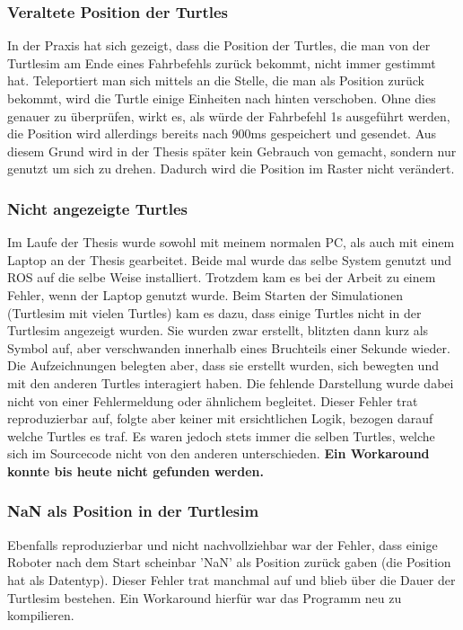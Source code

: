 \subsubsection*{Veraltete Position der Turtles}
In der Praxis hat sich gezeigt, dass die Position der Turtles, die man von der Turtlesim am Ende eines Fahrbefehls zurück bekommt, nicht immer gestimmt hat. Teleportiert man sich mittels  an die Stelle, die man als Position zurück bekommt, wird die Turtle einige Einheiten nach hinten verschoben. Ohne dies genauer zu überprüfen, wirkt es, als würde der Fahrbefehl 1s ausgeführt werden, die Position wird allerdings bereits nach 900ms gespeichert und gesendet.
Aus diesem Grund wird in der Thesis später kein Gebrauch von  gemacht, sondern nur  genutzt um sich zu drehen. Dadurch wird die Position im Raster nicht verändert.

\subsubsection*{Nicht angezeigte Turtles}
Im Laufe der Thesis wurde sowohl mit meinem normalen PC, als auch mit einem Laptop an der Thesis gearbeitet. Beide mal wurde das selbe System genutzt und \ac{ROS} auf die selbe Weise installiert. Trotzdem kam es bei der Arbeit zu einem Fehler, wenn der Laptop genutzt wurde. Beim Starten der Simulationen (Turtlesim mit vielen Turtles) kam es dazu, dass einige Turtles nicht in der Turtlesim angezeigt wurden. Sie wurden zwar erstellt, blitzten dann kurz als Symbol auf, aber verschwanden innerhalb eines Bruchteils einer Sekunde wieder. Die Aufzeichnungen belegten aber, dass sie erstellt wurden, sich bewegten und mit den anderen Turtles interagiert haben. Die fehlende Darstellung wurde dabei nicht von einer Fehlermeldung oder ähnlichem begleitet. Dieser Fehler trat reproduzierbar auf, folgte aber keiner mit ersichtlichen Logik, bezogen darauf welche Turtles es traf. Es waren jedoch stets immer die selben Turtles, welche sich im Sourcecode nicht von den anderen unterschieden. \textbf{Ein Workaround konnte bis heute nicht gefunden werden.}

\subsubsection*{NaN als Position in der Turtlesim}
Ebenfalls reproduzierbar und nicht nachvollziehbar war der Fehler, dass einige Roboter nach dem Start scheinbar 'NaN' als Position zurück gaben (die Position hat  als Datentyp). Dieser Fehler trat manchmal auf und blieb über die Dauer der Turtlesim bestehen. Ein Workaround hierfür war das Programm neu zu kompilieren.

